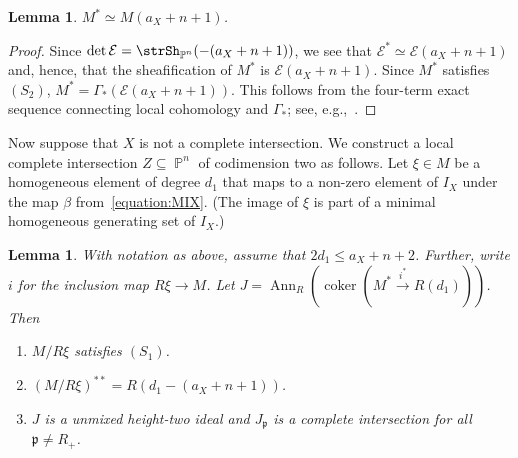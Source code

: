 \documentclass[11pt,a4paper]{amsart}
\theoremstyle{plain}
\newtheorem{lemma}[equation]{Lemma}
\theoremstyle{definition}
\newcommand{\calE}{\mathcal E}
\newcommand{\frakp}{{\mathfrak p}}
\DeclareMathOperator{\coker}{coker}
\DeclareMathOperator{\projective}{\mathbb{P}}
\DeclareMathOperator{\Ann}{Ann}
\begin{document}
\begin{lemma}
\label{lemma:Mdual}
$M^* \simeq M(a_X +n + 1)$.
\end{lemma}

\begin{proof}
%
Since $\det \calE = \strSh_{\projective^n}(-(a_X+n+1))$, we see that
$\calE^* \simeq \calE(a_X+n+1)$ and, hence, that
the sheafification of $M^*$ is $\calE(a_X+n+1)$.
Since $M^*$ satisfies $(S_2)$, $M^* = \Gamma_*(\calE(a_X+n+1))$. This
follows from the four-term exact sequence connecting local cohomology and
$\Gamma_*$; see, e.g.,~\cite[Theorem~A4.1]{eiscommalg}.
\end{proof}

Now suppose that $X$ is not a complete intersection.
We construct a local complete intersection $Z \subseteq
{\projective^n}$ of codimension two as follows.
Let $\xi \in M$ be a homogeneous element of degree $d_1$ that maps to a
non-zero element of $I_X$ under the map $\beta$ from~\eqref{equation:MIX}.
(The image of $\xi$ is part of a minimal homogeneous generating set of
$I_X$.)

\begin{lemma}
\label{lemma:Mmodxi}
With notation as above, assume that $2d_1 \leq a_X +n + 2$. 
Further, write $i$ for the inclusion map $R\xi \to M$.
Let $\displaystyle J = \Ann_R\left(\coker \left(M^*
\stackrel{i^*}{\to}R(d_1)\right)\right)$.
Then 
\begin{enumerate}

\item
\label{lemma:Mmodxi:S1}
$M/R\xi$ satisfies $(S_1)$.

\item
\label{lemma:Mmodxi:NdblDual}
$(M/R\xi)^{**} = R(d_1-(a_X + n + 1))$.

\item
\label{lemma:Mmodxi:Junm}
$J$ is a unmixed height-two ideal and $J_\frakp$ is a complete intersection
for all $\frakp \neq R_+$.

\end{enumerate}
\end{lemma}
\end{document}
